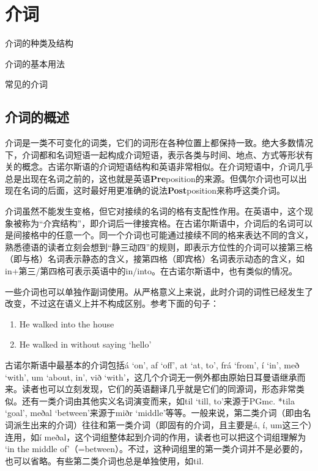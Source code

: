\chapter{介词}
\label{chp:preposition}
\begin{introduction}[章节要点]
    \item 介词的种类及结构
    \item 介词的基本用法
    \item 常见的介词
\end{introduction}

\section{介词的概述}
介词是一类不可变化的词类，它们的词形在各种位置上都保持一致。绝大多数情况下，介词都和名词短语一起构成介词短语，表示各类与时间、地点、方式等形状有关的概念。古诺尔斯语的介词短语结构和英语非常相似。在介词短语中，介词几乎总是出现在名词之前的，这也就是英语\textbf{Pre}position的来源。但偶尔介词也可以出现在名词的后面，这时最好用更准确的说法\textbf{Post}position来称呼这类介词。

介词虽然不能发生变格，但它对接续的名词的格有支配性作用。在英语中，这个现象被称为“介宾结构”，即介词后一律接宾格。在古诺尔斯语中，介词后的名词可以是间接格中的任意一个。同一个介词也可能通过接续不同的格来表达不同的含义，熟悉德语的读者立刻会想到“静三动四”的规则，即表示方位性的介词可以接第三格（即与格）名词表示静态的含义，接第四格（即宾格）名词表示动态的含义，如in+第三/第四格可表示英语中的in/into。在古诺尔斯语中，也有类似的情况。

一些介词也可以单独作副词使用。从严格意义上来说，此时介词的词性已经发生了改变，不过这在语义上并不构成区别。参考下面的句子：
\begin{enumerate}[itemindent=1em]
    \item He walked into the house
    \item He walked in without saying `hello'
\end{enumerate}
古诺尔斯语中最基本的介词包括á `on', af `off', at `at, to', frá `from', í `in', með `with',  um `about, in', við `with'，这几个介词无一例外都由原始日耳曼语继承而来。读者也可以立刻发现，它们的英语翻译几乎就是它们的同源词，形态非常类似。还有一类介词由其他实义名词演变而来，如til `till, to'来源于PGmc. *tila `goal', meðal `between'来源于miðr `middle'等等。一般来说，第二类介词（即由名词派生出来的介词）往往和第一类介词（即固有的介词，且主要是á, í, um这三个）连用，如í meðal，这个词组整体起到介词的作用，读者也可以把这个词组理解为 `in the middle of'（=between）。不过，这种词组里的第一类介词并不是必要的，也可以省略。有些第二类介词也总是单独使用，如til.
